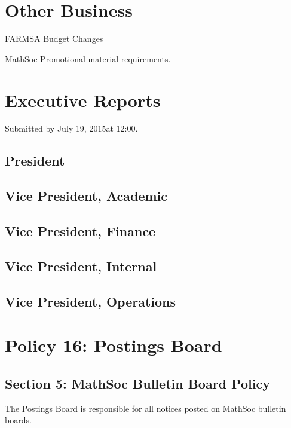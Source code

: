 \documentclass[12pt, letterpaper]{article}
\newcommand{\agendaDate}{July 19, 2015} %
\begin{document}
\section*{Other Business}
\begin{description}
	\item FARMSA Budget Changes
	\item \hyperref[clubs]{MathSoc Promotional material requirements.}
\end{description}
\HRule

\newpage


\newpage
\section*{Executive Reports}
Submitted by \agendaDate at 12:00.

\subsection*{President}


\subsection*{Vice President, Academic}


\subsection*{Vice President, Finance}


\subsection*{Vice President, Internal}


\subsection*{Vice President, Operations}


\newpage
{}
\section*{Policy 16: Postings Board}
\subsection*{Section 5: MathSoc Bulletin Board Policy}
The Postings Board is responsible for all notices posted on MathSoc bulletin boards.
\end{document}
